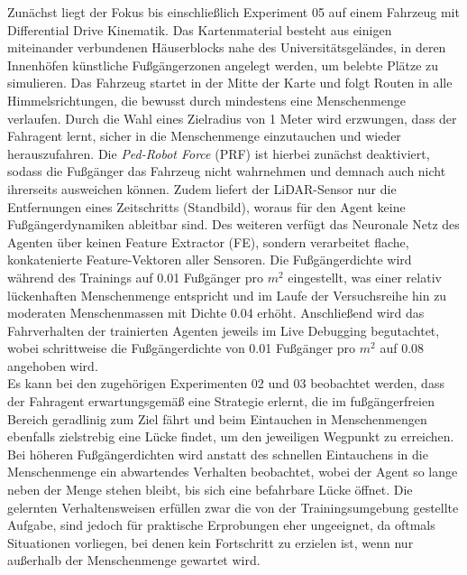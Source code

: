 Zunächst liegt der Fokus bis einschließlich Experiment 05 auf einem Fahrzeug mit
Differential Drive Kinematik. Das Kartenmaterial besteht aus einigen miteinander verbundenen
Häuserblocks nahe des Universitätsgeländes, in deren Innenhöfen künstliche Fußgängerzonen
angelegt werden, um belebte Plätze zu simulieren. Das Fahrzeug startet in der Mitte
der Karte und folgt Routen in alle Himmelsrichtungen, die bewusst durch mindestens
eine Menschenmenge verlaufen. Durch die Wahl eines Zielradius von 1 Meter wird erzwungen,
dass der Fahragent lernt, sicher in die Menschenmenge einzutauchen und wieder herauszufahren.
Die \emph{Ped-Robot Force} (PRF) ist hierbei zunächst deaktiviert, sodass die Fußgänger
das Fahrzeug nicht wahrnehmen und demnach auch nicht ihrerseits ausweichen können.
Zudem liefert der LiDAR-Sensor nur die Entfernungen eines Zeitschritts (Standbild),
woraus für den Agent keine Fußgängerdynamiken ableitbar sind.
Des weiteren verfügt das Neuronale Netz des Agenten über keinen Feature Extractor (FE),
sondern verarbeitet flache, konkatenierte Feature-Vektoren aller Sensoren.
Die Fußgängerdichte wird während des Trainings auf 0.01 Fußgänger pro $m^2$
eingestellt, was einer relativ lückenhaften Menschenmenge entspricht und im Laufe der
Versuchsreihe hin zu moderaten Menschenmassen mit Dichte 0.04 erhöht. Anschließend
wird das Fahrverhalten der trainierten Agenten jeweils im Live Debugging begutachtet,
wobei schrittweise die Fußgängerdichte von 0.01 Fußgänger pro $m^2$ auf 0.08 angehoben wird.\\

Es kann bei den zugehörigen Experimenten 02 und 03 beobachtet werden, dass der Fahragent
erwartungsgemäß eine Strategie erlernt, die im fußgängerfreien Bereich geradlinig zum Ziel
fährt und beim Eintauchen in Menschenmengen ebenfalls zielstrebig eine Lücke findet,
um den jeweiligen Wegpunkt zu erreichen. Bei höheren Fußgängerdichten wird anstatt des
schnellen Eintauchens in die Menschenmenge ein abwartendes Verhalten beobachtet, wobei
der Agent so lange neben der Menge stehen bleibt, bis sich eine befahrbare Lücke öffnet.
Die gelernten Verhaltensweisen erfüllen zwar die von der Trainingsumgebung gestellte
Aufgabe, sind jedoch für praktische Erprobungen eher ungeeignet, da oftmals Situationen
vorliegen, bei denen kein Fortschritt zu erzielen ist, wenn nur außerhalb der
Menschenmenge gewartet wird.\\

